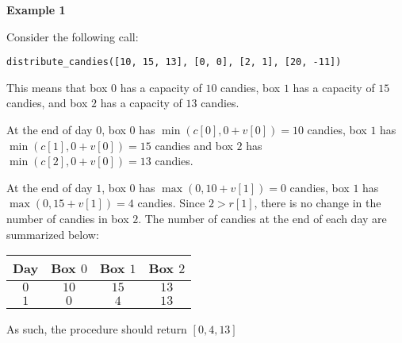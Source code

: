 \textbf{Example 1}

Consider the following call:

\texttt{distribute\_candies([10, 15, 13], [0, 0], [2, 1], [20, -11])}

This means that box $0$ has a capacity of $10$ candies, box $1$ has a capacity of $15$ candies, and box $2$ has a capacity of $13$ candies.

At the end of day $0$, box $0$ has $\min(c[0], 0+v[0]) = 10$ candies, box $1$ has
$\min(c[1], 0+v[0])=15$ candies and box $2$ has $\min(c[2], 0+v[0])=13$ candies.

At the end of day $1$, box $0$ has $\max(0, 10+v[1]) = 0$ candies, box $1$ has
$\max(0, 15+v[1]) = 4$ candies. Since $2 > r[1]$, there is no change in the number of candies in box $2$. The number of candies at the end of each day are summarized below:

\begin{center}
\renewcommand{\arraystretch}{1.5}
\begin{tabular}{|c|c|c|c|}
\hline
 Day & Box $0$ & Box $1$ & Box $2$ \\
\hline
$0$ & $10$ & $15$ & $13$ \\
\hline
$1$ & $0$ & $4$ & $13$ \\
\hline

\end{tabular}
\end{center}

As such, the procedure should return $[0, 4, 13]$